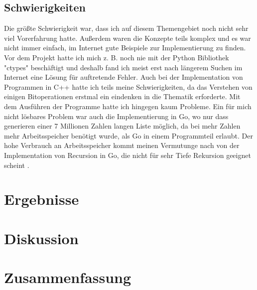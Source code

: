 \documentclass[12pt,a4paper]{article}
\begin{document}
\subsection{Schwierigkeiten}
Die größte Schwierigkeit war, dass ich auf diesem Themengebiet noch nicht sehr viel Vorerfahrung hatte.
Außerdem waren die Konzepte teils komplex und es war nicht immer einfach, im Internet gute Beispiele zur Implementierung
zu finden. Vor dem Projekt hatte ich mich z. B. noch nie mit der Python Bibliothek "ctypes" beschäftigt und deshalb fand
ich meist erst nach längerem Suchen im Internet eine Lösung für auftretende Fehler.
Auch bei der Implementation von Programmen in C++ hatte ich teils meine Schwierigkeiten, da das Verstehen
von einigen Bitoperationen erstmal ein eindenken in die Thematik erforderte.
Mit dem Ausführen der Programme hatte ich hingegen kaum Probleme.
Ein für mich nicht lösbares Problem war auch die Implementierung in Go, wo nur dass generieren
einer 7 Millionen Zahlen langen Liste möglich, da bei mehr Zahlen mehr Arbeitsspeicher benötigt wurde,
als Go in einem Programmteil erlaubt. Der hohe Verbrauch an Arbeitsspeicher kommt meinen Vermutunge
nach von der Implementation von Recursion in Go, die nicht für sehr Tiefe Rekursion geeignet scheint
\cite{godeeprecursionsto} \cite{goroutinesize}.



\clearpage
\section{Ergebnisse}
\clearpage
\section{Diskussion}
\clearpage
\section{Zusammenfassung}

\clearpage

\printbibliography[title={Literaturverzeichnis}]
\end{document}
